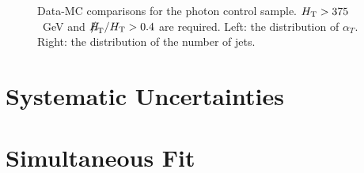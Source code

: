 \begin{figure}[h]
\begin{center}
\caption{\label{fig:photon_plots} Data-MC comparisons for the photon control sample.  $\mbox{$H_\text{T}$} > 375$~GeV and $\mht/\scalht>0.4$ are required.   Left: the distribution of $\alpha_{T}$.  Right: the distribution of the number of jets.}
\end{center}
\end{figure}

\section{Systematic Uncertainties}
\section{Simultaneous Fit}



